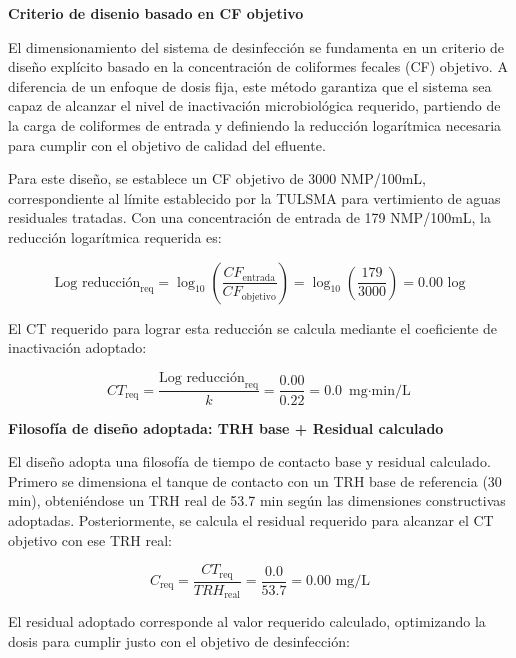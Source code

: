 \documentclass[12pt,a4paper]{article}
\begin{document}
\textbf{Criterio de disenio basado en CF objetivo}

El dimensionamiento del sistema de desinfección se fundamenta en un criterio de diseño explícito basado en la concentración de coliformes fecales (CF) objetivo. A diferencia de un enfoque de dosis fija, este método garantiza que el sistema sea capaz de alcanzar el nivel de inactivación microbiológica requerido, partiendo de la carga de coliformes de entrada y definiendo la reducción logarítmica necesaria para cumplir con el objetivo de calidad del efluente.

Para este diseño, se establece un CF objetivo de 3000 NMP/100mL, correspondiente al límite establecido por la TULSMA para vertimiento de aguas residuales tratadas. Con una concentración de entrada de 179 NMP/100mL, la reducción logarítmica requerida es:

\begin{equation}
\text{Log reducción}_{\text{req}} = \log_{10}\left(\frac{CF_{\text{entrada}}}{CF_{\text{objetivo}}}\right) = \log_{10}\left(\frac{179}{3000}\right) = 0.00 \text{ log}
\end{equation}

El CT requerido para lograr esta reducción se calcula mediante el coeficiente de inactivación adoptado:

\begin{equation}
CT_{\text{req}} = \frac{\text{Log reducción}_{\text{req}}}{k} = \frac{0.00}{0.22} = 0.0 \text{ mg$\cdot$min/L}
\end{equation}

\textbf{Filosofía de diseño adoptada: TRH base + Residual calculado}

El diseño adopta una filosofía de tiempo de contacto base y residual calculado. Primero se dimensiona el tanque de contacto con un TRH base de referencia (30 min), obteniéndose un TRH real de 53.7 min según las dimensiones constructivas adoptadas. Posteriormente, se calcula el residual requerido para alcanzar el CT objetivo con ese TRH real:

\begin{equation}
C_{\text{req}} = \frac{CT_{\text{req}}}{TRH_{\text{real}}} = \frac{0.0}{53.7} = 0.00 \text{ mg/L}
\end{equation}

El residual adoptado corresponde al valor requerido calculado, optimizando la dosis para cumplir justo con el objetivo de desinfección:
\end{document}
